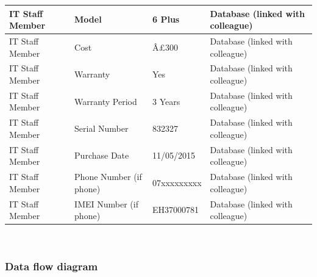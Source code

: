 \begin{longtable}{|p{3cm}|p{3cm}|p{3cm}|p{3cm}|}
IT Staff Member                             & Model                              & 6 Plus                                             & Database (linked with colleague)                                      \\ \hline
IT Staff Member                       & Cost                              & Â£300                                               & Database (linked with colleague)          \\ \hline
IT Staff Member                       & Warranty                           & Yes                                        & Database (linked with colleague)          \\ \hline
IT Staff Member                       & Warranty Period                           & 3 Years                                            & Database (linked with colleague)          \\ \hline
IT Staff Member                       & Serial Number                      & 832327                                             & Database (linked with colleague)          \\ \hline
IT Staff Member                       & Purchase Date                      & 11/05/2015                                         & Database (linked with colleague)          \\ \hline
IT Staff Member                       & Phone Number (if phone)            & 07xxxxxxxxx                                        & Database (linked with colleague)          \\ \hline
IT Staff Member		&IMEI Number (if phone)            & EH37000781                                      & Database (linked with colleague)          \\ \hline	
\end{longtable}
\

\subsubsection{Data flow diagram}

